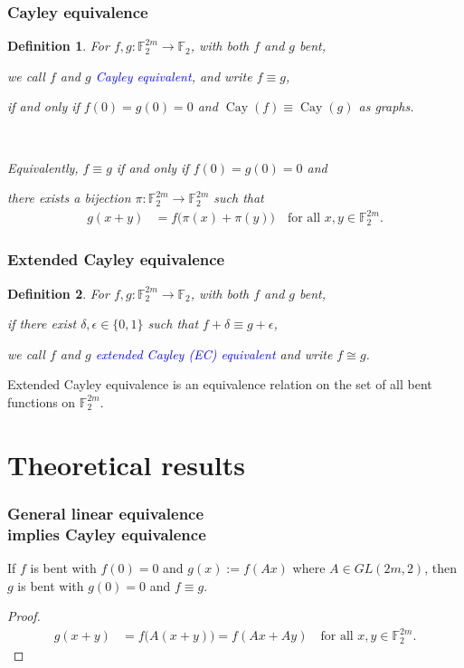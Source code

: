 \documentclass[pdf,sprung,slideColor,nocolorBG]{beamer}
\newenvironment{colortheme}[1]{
\def\ProvidesPackageRCS $##1${\relax}
\renewcommand{\ProcessOptions}{\relax}
\makeatletter

\makeatother
}{}
\newcommand{\mb}[1]{\mathbb{#1}}
\newcommand{\Emph}[1]{\emph{\textcolor{blue}{#1}}}
\newcommand{\To}{\rightarrow}
\newcommand{\Cay}[1]{\operatorname{Cay}\left(#1\right)}
\newcommand{\F}{\mb{F}}
\newtheorem{Def}{Definition}
\begin{document}
\begin{colortheme}{jubata}
\begin{frame}
\frametitle{Cayley equivalence}
\begin{Def}
%
For $f, g : \F_2^{2m} \To \F_2$, with both $f$ and $g$ bent,

we call $f$ and $g$ \Emph{Cayley equivalent},
and write $f \equiv g$,

if and only if $f(0)=g(0)=0$ and $\Cay{f} \equiv \Cay{g}$ as graphs.

~

Equivalently, $f \equiv g$ if and only if $f(0)=g(0)=0$ and

there exists a bijection $\pi : \F_2^{2m} \To \F_2^{2m}$ such that
\begin{align*}
g(x+y) &= f \big(\pi(x)+\pi(y)\big) \quad \text{for all~} x,y \in \F_2^{2m}.
\end{align*}
\end{Def}
\end{frame}
\begin{frame}
\frametitle{Extended Cayley equivalence}
\begin{Def}
For $f, g : \F_2^{2m} \To \F_2$, with both $f$ and $g$ bent,

if there exist $\delta, \epsilon \in \{0,1\}$ such that $f + \delta \equiv g + \epsilon$,

we call $f$ and $g$ \Emph{extended Cayley (EC) equivalent} and write $f \cong g$.
\end{Def}
Extended Cayley equivalence is an equivalence relation on the set of all bent functions on $\F_2^{2m}$.
\end{frame}
\section{Theoretical results}

\begin{frame}
\frametitle{General linear equivalence \\ implies Cayley equivalence}

\begin{Theorem}
If $f$ is bent with $f(0)=0$ and $g(x) := f(A x)$ where $A \in GL(2m,2)$,
then $g$ is bent with $g(0)=0$ and $f \equiv g$.
\end{Theorem}
\begin{proof}
\begin{align*}
g(x+y) &= f\big(A(x+y)\big) = f(A x + A y)\quad \text{for all~} x,y \in \F_2^{2m}.
\end{align*}
\end{proof}


\end{frame}
\end{colortheme}
\end{document}
